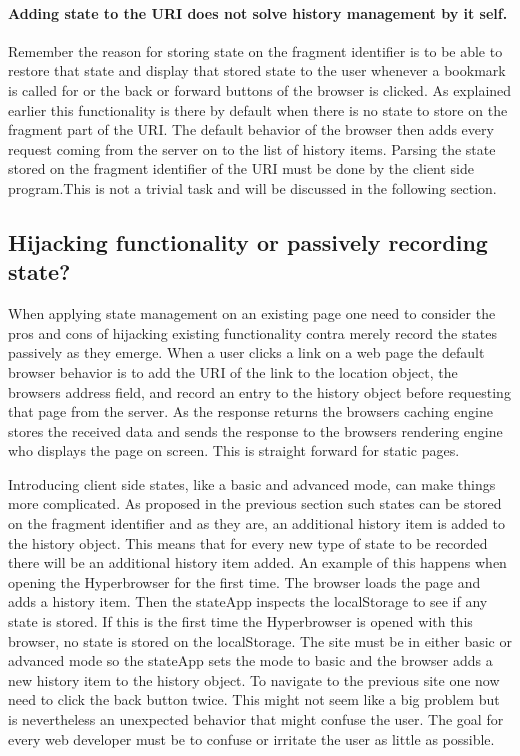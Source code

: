 \documentclass[english]{ifimaster}
\begin{document}
\paragraph{Adding state to the URI does not solve history management by it self.} 
Remember the reason for storing state on the fragment identifier is to be able to restore that state and display that stored state to the user whenever a bookmark is called for or the back or forward buttons of the browser is clicked. As explained earlier this functionality is there by default when there is no state to store on the fragment part of the URI. The default behavior of the browser then adds every request coming from the server on to the list of history items. Parsing the state stored on the fragment identifier of the URI must be done by the client side program.This is not a trivial task and will be discussed in the following section.

\subsection{Hijacking functionality or passively recording state?}
When applying state management on an existing page one need to consider the pros and cons of hijacking existing functionality contra merely record the states passively as they emerge. When a user clicks a link on a web page the default browser behavior is to add the URI of the link to the location object, the browsers address field, and record an entry to the history object before requesting that page from the server. As the response returns the browsers caching engine stores the received data and sends the response to the browsers rendering engine who displays the page on screen. This is straight forward for static pages.

Introducing client side states, like a basic and advanced mode, can make things more complicated. As proposed in the previous section such states can be stored on the fragment identifier and as they are, an additional history item is added to the history object. This means that for every new type of state to be recorded there will be an additional history item added. An example of this happens when opening the Hyperbrowser for the first time. The browser loads the page and adds a history item. Then the stateApp inspects the localStorage to see if any state is stored. If this is the first time the Hyperbrowser is opened with this browser, no state is stored on the localStorage. The site must be in either basic or advanced mode so the stateApp sets the mode to basic and the browser adds a new history item to the history object. To navigate to the previous site one now need to click the back button twice. This might not seem like a big problem but is nevertheless an unexpected behavior that might confuse the user. The goal for every web developer must be to confuse or irritate the user as little as possible.
\end{document}
